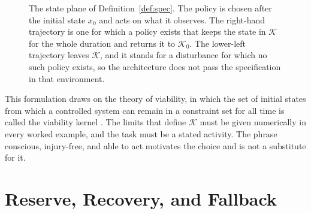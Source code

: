 \documentclass[11pt,openany]{book}
\theoremstyle{definition}
\theoremstyle{remark}
\newcommand{\Kset}{\mathcal{K}}
\newcommand{\Dset}{\mathcal{D}}
\begin{document}
\begin{figure}[ht]
\centering
{}
\caption{The state plane of Definition~\ref{def:spec}. The policy is chosen after the initial state $x_0$ and acts on what it observes. The right-hand trajectory is one for which a policy exists that keeps the state in $\Kset$ for the whole duration and returns it to $\Kset_0$. The lower-left trajectory leaves $\Kset$, and it stands for a disturbance for which no such policy exists, so the architecture does not pass the specification in that environment.}
\label{fig:viable}
\end{figure}

This formulation draws on the theory of viability, in which the set of initial states from which a controlled system can remain in a constraint set for all time is called the viability kernel \cite{aubin1991}. The limits that define $\Kset$ must be given numerically in every worked example, and the task must be a stated activity. The phrase conscious, injury-free, and able to act motivates the choice and is not a substitute for it.

\section{Reserve, Recovery, and Fallback}
\end{document}
